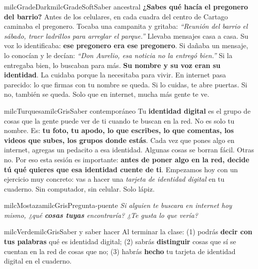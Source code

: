 \documentclass[11pt,letterpaper]{article}
\begin{document}
\begin{softbox}{milcGradeDark}{milcGradeSoft}{Saber ancestral}
\textbf{¿Sabes qué hacía el pregonero del barrio?} Antes de los celulares, en cada cuadra del centro de Cartago caminaba el pregonero. Tocaba una campanita y gritaba: \emph{``Reunión del barrio el sábado, traer ladrillos para arreglar el parque.''} Llevaba mensajes casa a casa. Su voz lo identificaba: \textbf{ese pregonero era ese pregonero}. Si dañaba un mensaje, lo conocían y le decían: \emph{``Don Aurelio, esa noticia no la entregó bien.''} Si la entregaba bien, lo buscaban para más. \textbf{Su nombre y su voz eran su identidad}. La cuidaba porque la necesitaba para vivir. En internet pasa parecido: lo que firmas con tu nombre se queda. Si lo cuidas, te abre puertas. Si no, también se queda. Solo que en internet, mucha más gente te ve.
\end{softbox}

\begin{softbox}{milcTurquesa}{milcGris}{Saber contemporáneo}
Tu \textbf{identidad digital} es el grupo de cosas que la gente puede ver de ti cuando te buscan en la red. No es solo tu nombre. Es: \textbf{tu foto, tu apodo, lo que escribes, lo que comentas, los videos que subes, los grupos donde estás}. Cada vez que pones algo en internet, agregas un pedacito a esa identidad. Algunas cosas se borran fácil. Otras no. Por eso esta sesión es importante: \textbf{antes de poner algo en la red, decide tú qué quieres que esa identidad cuente de ti}. Empezamos hoy con un ejercicio muy concreto: vas a hacer una \emph{tarjeta de identidad digital} en tu cuaderno. Sin computador, sin celular. Solo lápiz.
\end{softbox}

\begin{softbox}{milcMostaza}{milcGris}{Pregunta-puente}
\textit{Si alguien te buscara en internet hoy mismo, ¿qué \textbf{cosas tuyas} encontraría? ¿Te gusta lo que vería?}
\end{softbox}

\begin{softbox}{milcVerde}{milcGris}{Saber y saber hacer}
Al terminar la clase: (1) podrás \textbf{decir con tus palabras} qué es identidad digital; (2) sabrás \textbf{distinguir} cosas que sí se cuentan en la red de cosas que no; (3) habrás \textbf{hecho} tu tarjeta de identidad digital en el cuaderno.
\end{softbox}
\end{document}
